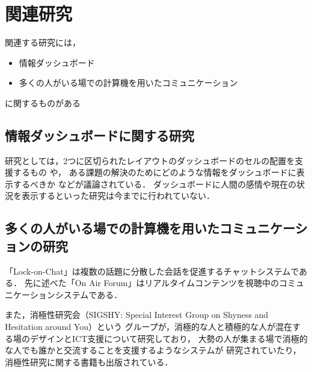 \section{関連研究}
関連する研究には，
\begin{itemize}
\item 情報ダッシュボード
\item 多くの人がいる場での計算機を用いたコミュニケーション
\end{itemize}
に関するものがある

\subsection{情報ダッシュボードに関する研究}
研究としては，2つに区切られたレイアウトのダッシュボードのセルの配置を支援するもの
\cite{Hertzog:2015:BSP:2678025.2701383}や，
ある課題の解決のためにどのような情報をダッシュボードに表示するべきか
\cite{Jones:2015:ECI:2800835.2800963}などが議論されている．
ダッシュボードに人間の感情や現在の状況を表示するといった研究は今までに行われていない．

\subsection{多くの人がいる場での計算機を用いたコミュニケーションの研究}
「Lock-on-Chat\cite{nishida2006}」は複数の話題に分散した会話を促進するチャットシステムである．
先に述べた「On Air Forum」はリアルタイムコンテンツを視聴中のコミュニケーションシステムである．

また，消極性研究会（SIGSHY: Special Interest Group on Shyness and Hesitation around You）という
グループが，消極的な人と積極的な人が混在する場のデザインとICT支援について研究しており，
大勢の人が集まる場で消極的な人でも誰かと交流することを支援するようなシステム\cite{nishida2011}が
研究されていたり，消極性研究に関する書籍\cite{kurihara2016}も出版されている．
